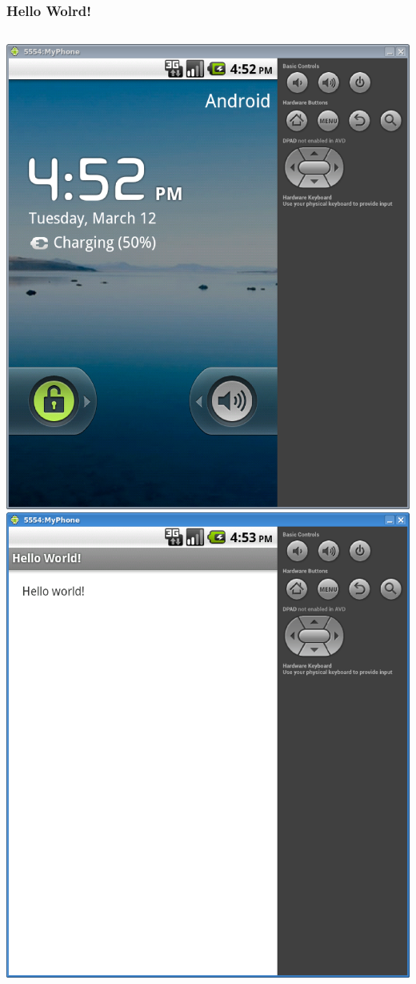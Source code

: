 \begin{frame}
\frametitle{Hello Wolrd!}
\begin{columns}
\centering
\includegraphics[width= 1.0 \textwidth]{MyPhone.eps}
\centering
\includegraphics[width= 1.0 \textwidth]{HelloWorld.eps}
\end{columns}
\end{frame}

